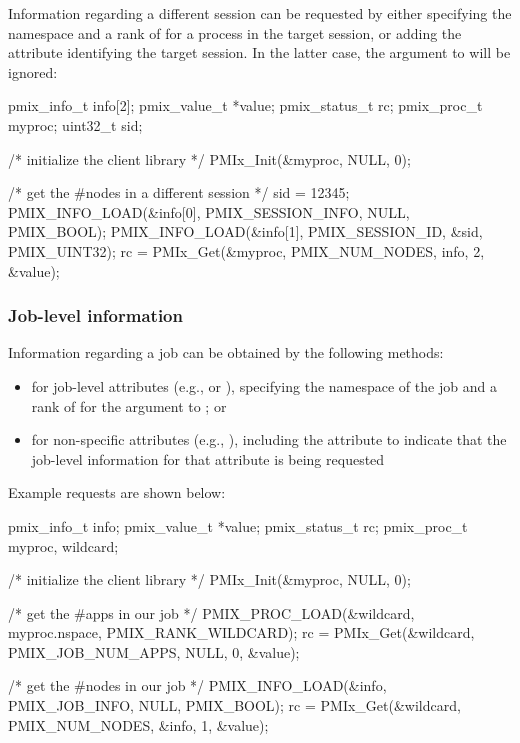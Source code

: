 Information regarding a different session can be requested by either specifying the namespace and a rank of  for a process in the target session, or adding the  attribute identifying the target session. In the latter case, the  argument to  will be ignored:

\cspecificstart
\begin{codepar}
pmix_info_t info[2];
pmix_value_t *value;
pmix_status_t rc;
pmix_proc_t myproc;
uint32_t sid;

/* initialize the client library */
PMIx_Init(&myproc, NULL, 0);

/* get the #nodes in a different session */
sid = 12345;
PMIX_INFO_LOAD(&info[0], PMIX_SESSION_INFO, NULL, PMIX_BOOL);
PMIX_INFO_LOAD(&info[1], PMIX_SESSION_ID, &sid, PMIX_UINT32);
rc = PMIx_Get(&myproc, PMIX_NUM_NODES, info, 2, &value);
\end{codepar}
\cspecificend

\subsubsection{Job-level information}

Information regarding a job can be obtained by the following methods:

\begin{itemize}
\item for job-level attributes (e.g.,  or ), specifying the namespace of the job and a rank of  for the  argument to ; or
\item for non-specific attributes (e.g., ), including the  attribute to indicate that the job-level information for that attribute is being requested
\end{itemize}

Example requests are shown below:

\cspecificstart
\begin{codepar}
pmix_info_t info;
pmix_value_t *value;
pmix_status_t rc;
pmix_proc_t myproc, wildcard;

/* initialize the client library */
PMIx_Init(&myproc, NULL, 0);

/* get the #apps in our job */
PMIX_PROC_LOAD(&wildcard, myproc.nspace, PMIX_RANK_WILDCARD);
rc = PMIx_Get(&wildcard, PMIX_JOB_NUM_APPS, NULL, 0, &value);

/* get the #nodes in our job */
PMIX_INFO_LOAD(&info, PMIX_JOB_INFO, NULL, PMIX_BOOL);
rc = PMIx_Get(&wildcard, PMIX_NUM_NODES, &info, 1, &value);
\end{codepar}
\cspecificend


